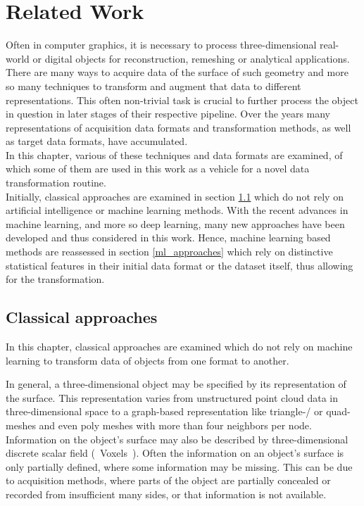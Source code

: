 \chapter{Related Work}
\label{sec:relatedwork}
Often in computer graphics, it is necessary to process three-dimensional real-world or digital objects for reconstruction, remeshing or analytical applications. There are many ways to acquire data of the surface of such geometry and more so many techniques to transform and augment that data to different representations. This often non-trivial task is crucial to further process the object in question in later stages of their respective pipeline. Over the years many representations of acquisition data formats and transformation methods, as well as target data formats, have accumulated.\\
In this chapter, various of these techniques and data formats are examined, of which some of them are used in this work as a vehicle for a novel data transformation routine.\\
Initially, classical approaches are examined in section \ref{classic_approaches} which do not rely on artificial intelligence or machine learning methods.
With the recent advances in machine learning, and more so deep learning, many new approaches have been developed and thus considered in this work.
Hence, machine learning based methods are reassessed in section \ref{ml_approaches} which rely on distinctive statistical features in their initial data format or the dataset itself, thus allowing for the transformation.
\section{Classical approaches}
\label{classic_approaches}
  In this chapter, classical approaches are examined which do not rely on machine
  learning to transform data of objects from one format to another. 

  In general, a three-dimensional object may be specified by its representation of the
  surface. This representation varies from unstructured point cloud data in three-dimensional space
  to a graph-based representation like triangle-/ or quad-meshes and even poly meshes
  with more than four neighbors per node. Information on the object's surface may also be described
  by three-dimensional discrete scalar field (~Voxels~).  Often the information on an object's
  surface is only partially defined, where some information may be missing. 
  This can be due to acquisition methods, where parts of the object are partially 
  concealed or recorded from insufficient many sides, or that information is not available.

